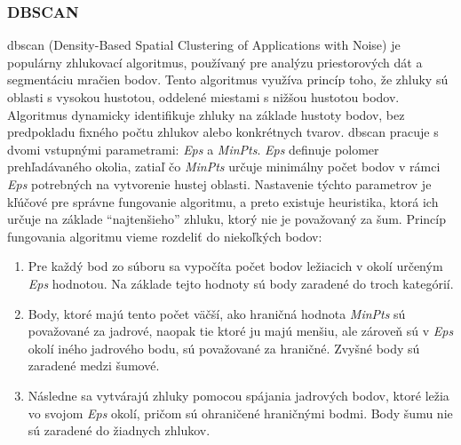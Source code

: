 \subsubsection{DBSCAN}
\noindent \acrshort{dbscan} (Density-Based Spatial Clustering of Applications with Noise) je populárny zhlukovací algoritmus, používaný pre analýzu priestorových dát a segmentáciu mračien bodov. Tento algoritmus využíva princíp toho, že zhluky sú oblasti s vysokou hustotou, oddelené miestami s nižšou hustotou bodov. Algoritmus dynamicky identifikuje zhluky na základe hustoty bodov, bez predpokladu fixného počtu zhlukov alebo konkrétnych tvarov. \cite{DBSCAN_original} 
\newline\indent \acrshort{dbscan} pracuje s dvomi vstupnými parametrami: \textit{Eps} a \textit{MinPts}. \textit{Eps} definuje polomer prehľadávaného okolia, zatiaľ čo \textit{MinPts} určuje minimálny počet bodov v rámci \textit{Eps} potrebných na vytvorenie hustej oblasti. Nastavenie týchto parametrov je kľúčové pre správne fungovanie algoritmu, a preto existuje heuristika, ktorá ich určuje na základe ``najtenšieho'' zhluku, ktorý nie je považovaný za šum. \cite{DBSCAN_original}
\newline\indent Princíp fungovania algoritmu vieme rozdeliť do niekoľkých bodov:
\begin{enumerate}
    \item Pre každý bod zo súboru sa vypočíta počet bodov ležiacich v okolí určeným \textit{Eps} hodnotou. Na základe tejto hodnoty sú body zaradené do troch kategórií.  
    \item Body, ktoré majú tento počet väčší, ako hraničná hodnota \textit{MinPts} sú považované za jadrové, naopak tie ktoré ju majú menšiu, ale zároveň sú  v \textit{Eps} okolí iného jadrového bodu, sú považované za hraničné. Zvyšné body sú zaradené medzi šumové.
    \item Následne sa vytvárajú zhluky pomocou spájania jadrových bodov, ktoré ležia vo svojom \textit{Eps} okolí, pričom sú ohraničené hraničnými bodmi. Body šumu nie sú zaradené do žiadnych zhlukov.
\end{enumerate}


